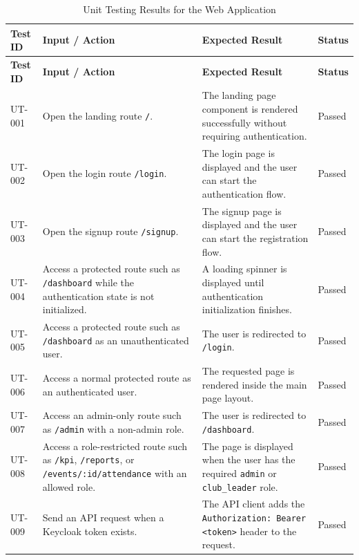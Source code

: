 
\begin{longtable}{|p{}|p{}|p{}|p{}|}
\caption{Unit Testing Results for the Web Application}
\label{tab:web-app-unit-testing}\\
\hline
\textbf{Test ID} & \textbf{Input / Action} & \textbf{Expected Result} & \textbf{Status} \\
\hline
\endfirsthead

\hline
\textbf{Test ID} & \textbf{Input / Action} & \textbf{Expected Result} & \textbf{Status} \\
\hline
\endhead

UT-001 & Open the landing route \texttt{/}. & The landing page component is rendered successfully without requiring authentication. & Passed \\
\hline
UT-002 & Open the login route \texttt{/login}. & The login page is displayed and the user can start the authentication flow. & Passed \\
\hline
UT-003 & Open the signup route \texttt{/signup}. & The signup page is displayed and the user can start the registration flow. & Passed \\
\hline
UT-004 & Access a protected route such as \texttt{/dashboard} while the authentication state is not initialized. & A loading spinner is displayed until authentication initialization finishes. & Passed \\
\hline
UT-005 & Access a protected route such as \texttt{/dashboard} as an unauthenticated user. & The user is redirected to \texttt{/login}. & Passed \\
\hline
UT-006 & Access a normal protected route as an authenticated user. & The requested page is rendered inside the main page layout. & Passed \\
\hline
UT-007 & Access an admin-only route such as \texttt{/admin} with a non-admin role. & The user is redirected to \texttt{/dashboard}. & Passed \\
\hline
UT-008 & Access a role-restricted route such as \texttt{/kpi}, \texttt{/reports}, or \texttt{/events/:id/attendance} with an allowed role. & The page is displayed when the user has the required \texttt{admin} or \texttt{club\_leader} role. & Passed \\
\hline
UT-009 & Send an API request when a Keycloak token exists. & The API client adds the \texttt{Authorization: Bearer <token>} header to the request. & Passed \\

\end{longtable}
